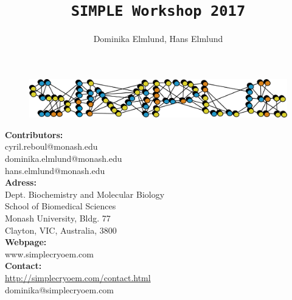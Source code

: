 \documentclass[a4paper,11pt]{article}
\newcommand{\prgname}[1]{\textcolor{NavyBlue}{\texttt{#1}}}
\begin{document}
\begin{figure}
\centering
\includegraphics[keepaspectratio=true,scale=0.6]{./SIMPLE_logo/rawlogo}
\end{figure}

\title{\prgname{SIMPLE Workshop 2017}}
\author{Dominika Elmlund, Hans Elmlund}
\maketitle

\vspace{1em}
\begin{minipage}[ht]{0.48\textwidth}
\textbf{Contributors:}\\
cyril.reboul@monash.edu\\
dominika.elmlund@monash.edu\\
hans.elmlund@monash.edu\\
\textbf{Adress:}\\
Dept. Biochemistry and Molecular Biology\\
School of Biomedical Sciences\\
Monash University, Bldg. 77\\
Clayton, VIC, Australia, 3800\\
\textbf{Webpage:}\\
www.simplecryoem.com\\
\textbf{Contact:}\\
\url{http://simplecryoem.com/contact.html}\\
dominika@simplecryoem.com\\
\end{minipage}
\vspace{20pt}
\end{document}
